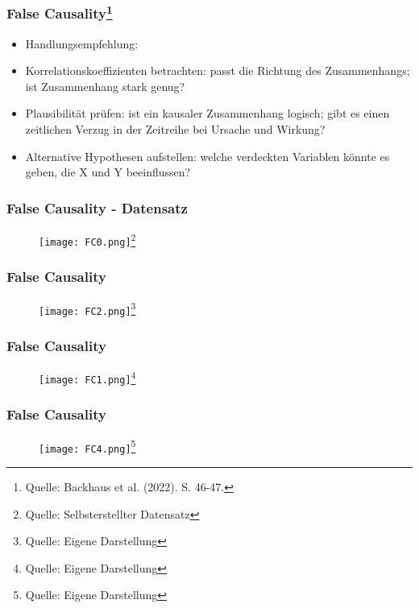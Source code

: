 \documentclass{beamer}
\begin{document}
\begin{frame}
\frametitle{False Causality\footnote{Quelle: {Backhaus et al. (2022). S. 46-47.}}}
\begin{itemize}
    \item Handlungsempfehlung:
    \item Korrelationskoeffizienten betrachten: passt die Richtung des Zusammenhangs; ist Zusammenhang stark genug?
    \item Plausibilität prüfen: ist ein kausaler Zusammenhang logisch; gibt es einen zeitlichen Verzug in der Zeitreihe bei Ursache und Wirkung?
    \item Alternative Hypothesen aufstellen: welche verdeckten Variablen könnte es geben, die X und Y beeinflussen?
\end{itemize}
\end{frame}

\begin{frame}
\frametitle{False Causality - Datensatz}

\begin{figure}
    \centering
    \texttt{[image: FC0.png]}\footnote{Quelle: {Selbsterstellter Datensatz}}
    
\end{figure}

\end{frame}

\begin{frame}
\frametitle{False Causality}

\begin{figure}
    \centering
    \texttt{[image: FC2.png]}\footnote{Quelle: {Eigene Darstellung}}
    
\end{figure}

\end{frame}

\begin{frame}
\frametitle{False Causality}

\begin{figure}
    \centering
    \texttt{[image: FC1.png]}\footnote{Quelle: {Eigene Darstellung}}
    
\end{figure}

\end{frame}

\begin{frame}
\frametitle{False Causality}

\begin{figure}
    \centering
    \texttt{[image: FC4.png]}\footnote{Quelle: {Eigene Darstellung}}
    
\end{figure}

\end{frame}
\end{document}

